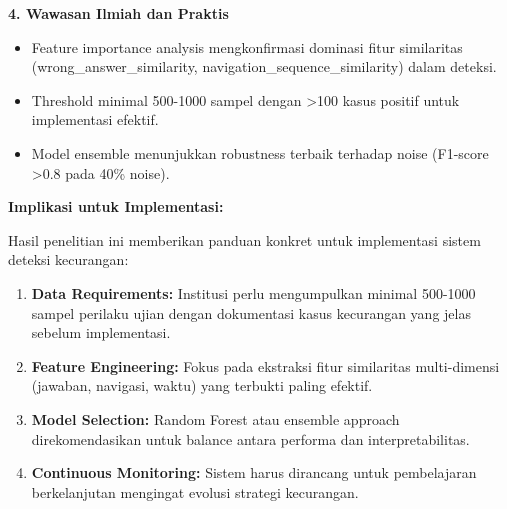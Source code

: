 \textbf{4. Wawasan Ilmiah dan Praktis}
\begin{itemize}
    \item Feature importance analysis mengkonfirmasi dominasi fitur similaritas (wrong\_answer\_similarity, navigation\_sequence\_similarity) dalam deteksi.
    \item Threshold minimal 500-1000 sampel dengan >100 kasus positif untuk implementasi efektif.
    \item Model ensemble menunjukkan robustness terbaik terhadap noise (F1-score >0.8 pada 40\% noise).
\end{itemize}

\textbf{Implikasi untuk Implementasi:}

Hasil penelitian ini memberikan panduan konkret untuk implementasi sistem deteksi kecurangan:
\begin{enumerate}
    \item \textbf{Data Requirements:} Institusi perlu mengumpulkan minimal 500-1000 sampel perilaku ujian dengan dokumentasi kasus kecurangan yang jelas sebelum implementasi.
    
    \item \textbf{Feature Engineering:} Fokus pada ekstraksi fitur similaritas multi-dimensi (jawaban, navigasi, waktu) yang terbukti paling efektif.
    
    \item \textbf{Model Selection:} Random Forest atau ensemble approach direkomendasikan untuk balance antara performa dan interpretabilitas.
    
    \item \textbf{Continuous Monitoring:} Sistem harus dirancang untuk pembelajaran berkelanjutan mengingat evolusi strategi kecurangan.
\end{enumerate}
